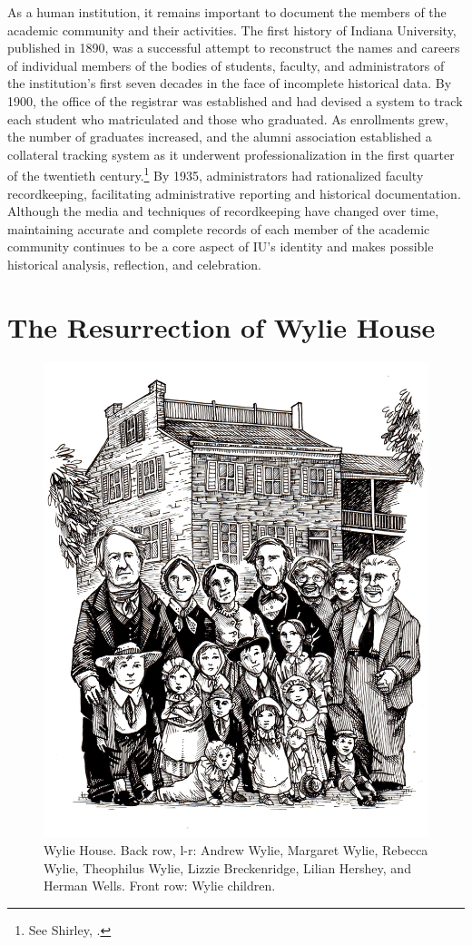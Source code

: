 \documentclass[
  american,
  letterpaper,
]{scrreprt}
\begin{document}
As a human institution, it remains important to document the members of
the academic community and their activities. The first history of
Indiana University, published in 1890, was a successful attempt to
reconstruct the names and careers of individual members of the bodies of
students, faculty, and administrators of the institution's first seven
decades in the face of incomplete historical data. By 1900, the office
of the registrar was established and had devised a system to track each
student who matriculated and those who graduated. As enrollments grew,
the number of graduates increased, and the alumni association
established a collateral tracking system as it underwent
professionalization in the first quarter of the twentieth
century.\footnote{See Shirley, .} By 1935, administrators had
rationalized faculty recordkeeping, facilitating administrative
reporting and historical documentation. Although the media and
techniques of recordkeeping have changed over time, maintaining accurate
and complete records of each member of the academic community continues
to be a core aspect of IU's identity and makes possible historical
analysis, reflection, and celebration.


\chapter{The Resurrection of Wylie House}\label{sec-ten}

\begin{figure}[H]

{\centering \includegraphics[width=0.6\linewidth,height=\textheight,keepaspectratio]{images/miu10.jpeg}

}

\caption[Wylie House]{Wylie House. Back row, l-r: Andrew Wylie, Margaret
Wylie, Rebecca Wylie, Theophilus Wylie, Lizzie Breckenridge, Lilian
Hershey, and Herman Wells. Front row: Wylie children.}

\end{figure}%
\end{document}
